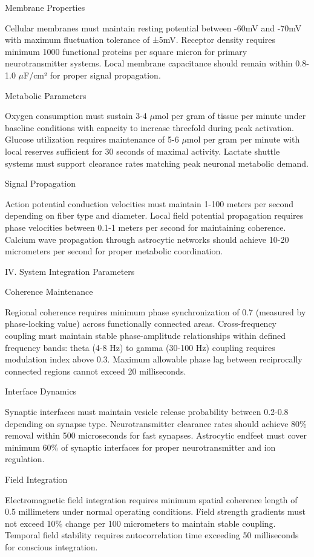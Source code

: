 Membrane Properties

Cellular membranes must maintain resting potential between -60mV and -70mV with maximum fluctuation tolerance of ±5mV. Receptor density requires minimum 1000 functional proteins per square micron for primary neurotransmitter systems. Local membrane capacitance should remain within 0.8-1.0 $\mu$F/cm² for proper signal propagation.

Metabolic Parameters

Oxygen consumption must sustain 3-4 $\mu$mol per gram of tissue per minute under baseline conditions with capacity to increase threefold during peak activation. Glucose utilization requires maintenance of 5-6 $\mu$mol per gram per minute with local reserves sufficient for 30 seconds of maximal activity. Lactate shuttle systems must support clearance rates matching peak neuronal metabolic demand.

Signal Propagation

Action potential conduction velocities must maintain 1-100 meters per second depending on fiber type and diameter. Local field potential propagation requires phase velocities between 0.1-1 meters per second for maintaining coherence. Calcium wave propagation through astrocytic networks should achieve 10-20 micrometers per second for proper metabolic coordination.

IV. System Integration Parameters

Coherence Maintenance

Regional coherence requires minimum phase synchronization of 0.7 (measured by phase-locking value) across functionally connected areas. Cross-frequency coupling must maintain stable phase-amplitude relationships within defined frequency bands: theta (4-8 Hz) to gamma (30-100 Hz) coupling requires modulation index above 0.3. Maximum allowable phase lag between reciprocally connected regions cannot exceed 20 milliseconds.

Interface Dynamics

Synaptic interfaces must maintain vesicle release probability between 0.2-0.8 depending on synapse type. Neurotransmitter clearance rates should achieve 80\% removal within 500 microseconds for fast synapses. Astrocytic endfeet must cover minimum 60\% of synaptic interfaces for proper neurotransmitter and ion regulation.

Field Integration

Electromagnetic field integration requires minimum spatial coherence length of 0.5 millimeters under normal operating conditions. Field strength gradients must not exceed 10\% change per 100 micrometers to maintain stable coupling. Temporal field stability requires autocorrelation time exceeding 50 milliseconds for conscious integration.

